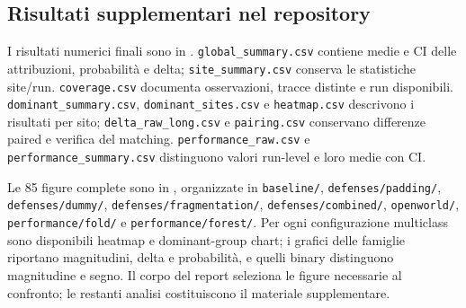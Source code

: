 \documentclass[11pt,a4paper]{article}
\begin{document}
\subsection{Risultati supplementari nel repository}
I risultati numerici finali sono in . \texttt{global\_summary.csv} contiene medie e CI delle attribuzioni, probabilità e delta; \texttt{site\_summary.csv} conserva le statistiche site/run. \texttt{coverage.csv} documenta osservazioni, tracce distinte e run disponibili. \texttt{dominant\_summary.csv}, \texttt{dominant\_sites.csv} e \texttt{heatmap.csv} descrivono i risultati per sito; \texttt{delta\_raw\_long.csv} e \texttt{pairing.csv} conservano differenze paired e verifica del matching. \texttt{performance\_raw.csv} e \texttt{performance\_summary.csv} distinguono valori run-level e loro medie con CI.

Le 85 figure complete sono in , organizzate in \texttt{baseline/}, \texttt{defenses/padding/}, \texttt{defenses/dummy/}, \texttt{defenses/fragmentation/}, \texttt{defenses/combined/}, \texttt{openworld/}, \texttt{performance/fold/} e \texttt{performance/forest/}. Per ogni configurazione multiclass sono disponibili heatmap e dominant-group chart; i grafici delle famiglie riportano magnitudini, delta e probabilità, e quelli binary distinguono magnitudine e segno. Il corpo del report seleziona le figure necessarie al confronto; le restanti analisi costituiscono il materiale supplementare.
\end{document}
